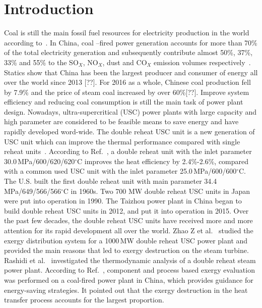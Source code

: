 \documentclass[preprint,12pt]{elsarticle}
\begin{document}
\section{Introduction}
\label{sec1:intro}
Coal is still the main fossil fuel resources for electricity production in the world according to~\cite{Ouedraogo2013Energy}. 
In China, coal –fired power generation accounts for more than 70\% of the total electricity generation and subsequently contribute almost 50\%, 37\%, 33\% and 55\% to the SO$_X$, NO$_X$, dust and CO$_X$ emission volumes respectively~\cite{Zhang2010Analysis}.
Statics show that China has been the largest producer and consumer of energy all over the world since 2013 [??]. 
For 2016 as a whole, Chinese coal production fell by 7.9\% and the price of steam coal increased by over 60\%[??]. 
Improve system efficiency and reducing coal consumption is still the main task of power plant design. Nowadays, ultra-supercritical (USC) power plants with large capacity and high parameter are considered to be feasible means to save energy and have rapidly developed word-wide.
The double reheat USC unit is a new generation of USC unit which can improve the thermal performance compared with single reheat units~\cite{Zhao2017Exergy}. 
According to Ref.~\cite{Yaxiu2013Thermal}, a double reheat unit with the inlet parameter 30.0\,MPa/600/620/620$^\circ$C improves the heat efficiency by 2.4\%-2.6\%, compared with a common used USC unit with the inlet parameter 25.0\,MPa/600/600$^\circ$C.
 The U.S. built the first double reheat unit with main parameter 34.4 MPa/649/566/566$^\circ$C in 1960s.
 Two 700 MW double reheat USC units in Japan were put into operation in 1990. 
 The Taizhou power plant in China began to build double reheat USC units in 2012, and put it into operation in 2015.
 Over the past few decades, the double reheat USC units have received more and more attention for its rapid development all over the world. Zhao Z et al.~\cite{Zhao2017Exergy} studied the exergy distribution system for a 1000\,MW double reheat USC power plant and provided the main reasons that led to exergy destruction on the steam turbine.
 Rashidi et al.~\cite{Rashidi2014Thermodynamic} investigated the thermodynamic analysis of a double reheat steam power plant.
 According to Ref.~\cite{Wu2014Component}, component and process based exergy evaluation was performed on a coal-fired power plant in China, which provides guidance for energy-saving strategies.
 It pointed out that the exergy destruction in the heat transfer process accounts for the largest proportion.
\end{document}
